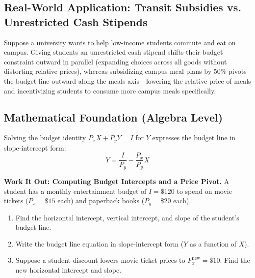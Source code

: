\documentclass[11pt,letterpaper]{article}
\begin{document}
\subsection*{Real-World Application: Transit Subsidies vs. Unrestricted Cash Stipends}
Suppose a university wants to help low-income students commute and eat on campus. Giving students an unrestricted cash stipend shifts their budget constraint outward in parallel (expanding choices across all goods without distorting relative prices), whereas subsidizing campus meal plans by $50\%$ pivots the budget line outward along the meals axis—lowering the relative price of meals and incentivizing students to consume more campus meals specifically.

\subsection*{Mathematical Foundation (Algebra Level)}
Solving the budget identity $P_x X + P_y Y = I$ for $Y$ expresses the budget line in slope-intercept form:
\begin{equation}
Y = \frac{I}{P_y} - \frac{P_x}{P_y}X
\end{equation}

\noindent\textbf{Work It Out: Computing Budget Intercepts and a Price Pivot.}
A student has a monthly entertainment budget of $I = \$120$ to spend on movie tickets ($P_x = \$15$ each) and paperback books ($P_y = \$20$ each).
\begin{enumerate}
    \item Find the horizontal intercept, vertical intercept, and slope of the student's budget line.
    \item Write the budget line equation in slope-intercept form ($Y$ as a function of $X$).
    \item Suppose a student discount lowers movie ticket prices to $P_x^{\text{new}} = \$10$. Find the new horizontal intercept and slope.
\end{enumerate}
\end{document}
